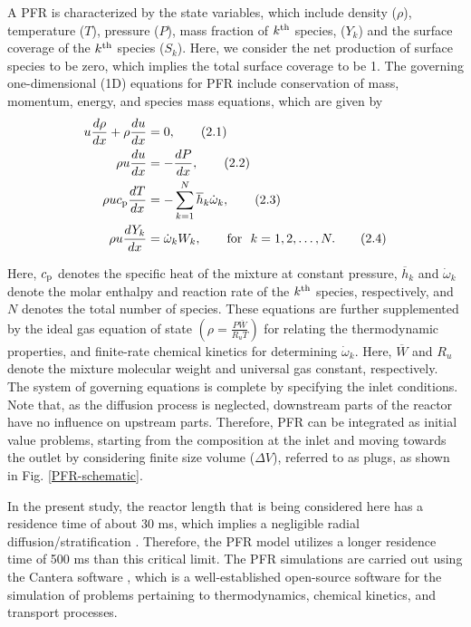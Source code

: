\documentclass[final, letterpaper, square, comma, numbers, sort&compress]{elsarticle}
\begin{document}
A PFR is characterized by the state variables, which include density ($\rho$), temperature ($T$), pressure ($P$), mass fraction of $k^{\rm th}$ species, ($Y_k$) and the surface coverage of the $k^{\rm th}$ species ($S_k$). Here, we consider the net production of surface species to be zero, which implies the total surface coverage to be 1. The governing one-dimensional (1D) equations for PFR include conservation of mass, momentum, energy, and species mass equations, which are given by
\begin{align}
    u\frac{d\rho}{dx} + \rho\frac{du}{dx} & = 0, \tag{2.1} \\
    \rho u\frac{du}{dx} & = -\frac{dP}{dx}, \tag{2.2} \\
    \rho u c_{\rm p} \frac{dT}{dx} & = -\sum^N_{k=1} \overline h_k \dot \omega_k, \tag{2.3} \\
    \rho u \frac{dY_k}{dx} & = \dot \omega_k W_k, \qquad \textrm{for }\ k = 1,2,\dots,N. \tag{2.4}
\end{align}

\noindent Here, $c_{\rm p}$ denotes the specific heat of the mixture at constant pressure, $\overline h_k$ and $\dot\omega_k$ denote the molar enthalpy and reaction rate of the $k^{\rm th}$ species, respectively, and $N$ denotes the total number of species. These equations are further supplemented by the ideal gas equation of state
$\displaystyle \left ( \rho = \frac{P\overline W}{R_u T} \right )$
for relating the thermodynamic properties, and finite-rate chemical kinetics for determining $\dot\omega_k$. Here, $\overline W$ and $R_u$ denote the mixture molecular weight and universal gas constant, respectively. The system of governing equations is complete by specifying the inlet conditions. Note that, as the diffusion process is neglected, downstream parts of the reactor have no influence on upstream parts. Therefore, PFR can be integrated as initial value problems, starting from the composition at the inlet and moving towards the outlet by considering finite size volume ($\Delta V$), referred to as plugs, as shown in Fig. \ref{PFR-schematic}.

In the present study, the reactor length that is being considered here has a residence time of about 30 ms, which implies a negligible radial diffusion/stratification \cite{Dang2022}. Therefore, the PFR model utilizes a longer residence time of 500 ms than this critical limit. The PFR simulations are carried out using the Cantera
software \cite{Goodwin2014}, which is a well-established open-source software for the simulation of problems pertaining to thermodynamics, chemical kinetics, and transport processes.
\end{document}
